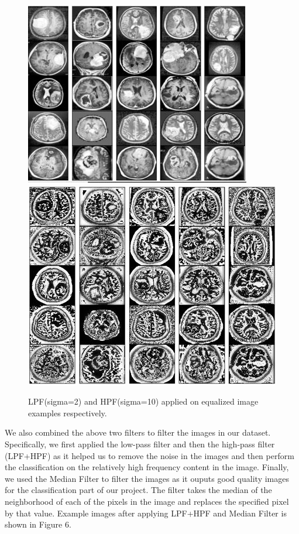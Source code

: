 \documentclass[conference]{IEEEtran}
\begin{document}
\begin{figure}[h]
\centering
\includegraphics[scale=0.43]{figures/lpf.JPG}
\includegraphics[scale=0.39]{figures/hpf.JPG}
\caption{LPF(sigma=2) and HPF(sigma=10) applied on equalized image examples respectively.}
\end{figure} 

We also combined the above two filters to filter the images in our dataset. Specifically, we first applied the low-pass filter and then the high-pass filter (LPF+HPF) as it helped us to remove the noise in the images and then perform the classification on the relatively high frequency content in the image. Finally, we used the Median Filter to filter the images as it ouputs good quality images for the classification part of our project. The filter takes the median of the neighborhood of each of the pixels in the image and replaces the specified pixel by that value. Example images after applying LPF+HPF and Median Filter is shown in Figure 6.
\end{document}
